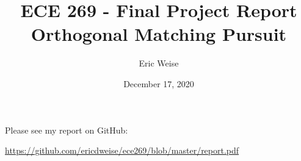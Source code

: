 \documentclass{article}
\title{ECE 269 - Final Project Report\\Orthogonal Matching Pursuit}
\author{Eric Weise}
\date{December 17, 2020}
\begin{document}
\maketitle

Please see my report on GitHub:

\url{https://github.com/ericdweise/ece269/blob/master/report.pdf}
\end{document}
